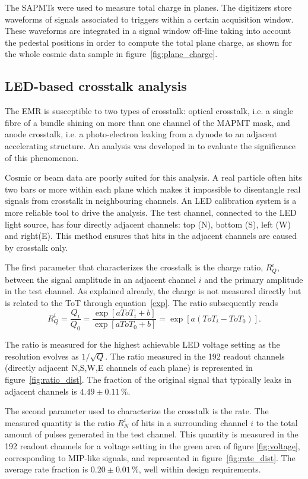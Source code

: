 \documentclass[a4paper,11pt]{article}
\begin{document}
The SAPMTs were used to measure total charge in planes. The digitizers store waveforms of signals associated to triggers within a certain acquisition
window. These waveforms are integrated in a signal window off-line taking into account the pedestal positions in order to compute the total plane
charge, as shown for the whole cosmic data sample in figure~\ref{fig:plane_charge}.

\subsection{LED-based crosstalk analysis}\label{sec_xt}
The EMR is susceptible to two types of crosstalk: optical crosstalk, i.e. a single fibre of a bundle shining on more than one channel of the MAPMT mask,
and anode crosstalk, i.e. a photo-electron leaking from a dynode to an adjacent accelerating structure. An analysis was developed in \cite{emr_xt, Francois}
to evaluate the significance of this phenomenon.

Cosmic or beam data are poorly suited for this analysis. A real particle often hits two bars or more within each plane which makes it impossible to
disentangle real signals from crosstalk in neighbouring channels. An LED calibration system is a more reliable tool to drive the analysis. The test channel,
connected to the LED light source, has four directly adjacent channels: top (N), bottom (S), left (W) and right(E). This method ensures that hits in the
adjacent channels are caused by crosstalk only.

The first parameter that characterizes the crosstalk is the charge ratio, $R_Q^i$, between the signal amplitude in an adjacent channel $i$ and the primary
amplitude in the test channel. As explained already, the charge is not measured directly but is related to the ToT through equation~\ref{exp}. The ratio
subsequently reads
\begin{equation}
R_Q^i=\frac{Q_i}{Q_0}=\frac{\exp[aToT_i+b]}{\exp[aToT_0+b]}=\exp\left[a(ToT_i-ToT_0)\right].
\end{equation}

The ratio is measured for the highest achievable LED voltage setting as the resolution evolves as $1/\sqrt{Q}$. The ratio measured in the 192 readout channels
(directly adjacent N,S,W,E channels of each plane) is represented in figure~\ref{fig:ratio_dist}. The fraction of the original signal that typically leaks in
adjacent channels is $4.49\pm0.11\,\%$.

The second parameter used to characterize the crosstalk is the rate. The measured quantity is the ratio $R_N^i$ of hits in a surrounding channel $i$ to the
total amount of pulses generated in the test channel. This quantity is measured in the 192 readout channels for a voltage setting in the green area of figure
\ref{fig:voltage}, corresponding to MIP-like signals, and represented in figure~\ref{fig:rate_dist}. The average rate fraction is $0.20\pm0.01\,\%$, well
within design requirements.
\end{document}

